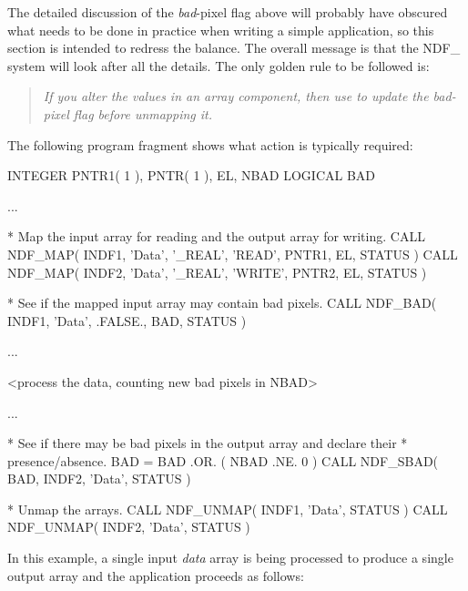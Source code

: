 \documentclass[twoside,11pt,nolof]{starlink}
\providecommand{\st}[1]{{\emph{#1}}}
\begin{document}
The detailed discussion of the \st{bad\/}-pixel flag above will probably have
obscured what needs to be done in practice when writing a simple application,
so this section is intended to redress the balance.
The overall message is that the NDF\_ system will look after all
the details.
The only golden rule to be followed is:

\begin{quote}
\begin{center}
\st{If you alter the values in an array component, then use \htmlref{NDF\_SBAD}{NDF_SBAD} to
update the bad-pixel flag before unmapping it.}
\end{center}
\end{quote}

The following program fragment shows what action is typically required:

\small
\begin{terminalv}
      INTEGER PNTR1( 1 ), PNTR( 1 ), EL, NBAD
      LOGICAL BAD

      ...

*  Map the input array for reading and the output array for writing.
      CALL NDF_MAP( INDF1, 'Data', '_REAL', 'READ', PNTR1, EL, STATUS )
      CALL NDF_MAP( INDF2, 'Data', '_REAL', 'WRITE', PNTR2, EL, STATUS )

*  See if the mapped input array may contain bad pixels.
      CALL NDF_BAD( INDF1, 'Data', .FALSE., BAD, STATUS )

      ...

      <process the data, counting new bad pixels in NBAD>

      ...

*  See if there may be bad pixels in the output array and declare their
*  presence/absence.
      BAD = BAD .OR. ( NBAD .NE. 0 )
      CALL NDF_SBAD( BAD, INDF2, 'Data', STATUS )

*  Unmap the arrays.
      CALL NDF_UNMAP( INDF1, 'Data', STATUS )
      CALL NDF_UNMAP( INDF2, 'Data', STATUS )
\end{terminalv}
\normalsize

In this example, a single input \st{data\/} array is being processed to produce a
single output array and the application proceeds as follows:
\end{document}
